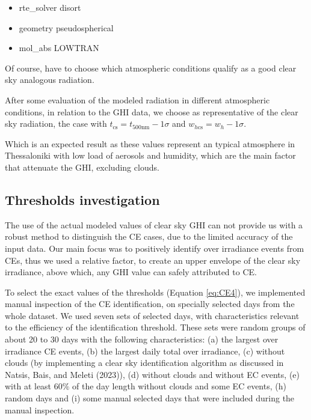 \documentclass[
]{article}
\providecommand{\tightlist}{%
  \setlength{\itemsep}{0pt}\setlength{\parskip}{0pt}}
\begin{document}
\begin{itemize}
\tightlist
\item
  rte\_solver disort
\item
  geometry pseudospherical
\item
  mol\_abs LOWTRAN
\end{itemize}

Of course, have to choose which atmospheric conditions qualify as a good clear sky analogous radiation.

After some evaluation of the modeled radiation in different atmospheric conditions,
in relation to the GHI data, we choose as representative of the clear sky radiation,
the case with
\(t_{\text{cs}} = t_{500\text{nm}} - 1\sigma\) and \(w_{h\text{cs}} = w_h - 1\sigma\).

Which is an expected result as these values represent an typical atmosphere in
Thessaloniki with low load of aerosols and humidity, which are the main factor that
attenuate the GHI, excluding clouds.

\hypertarget{thresholds-investigation}{%
\subsection{Thresholds investigation}\label{thresholds-investigation}}

The use of the actual modeled values of clear sky GHI can not provide us with a
robust method to distinguish the CE cases, due to the limited accuracy of the input
data. Our main focus was to positively identify over irradiance events from CEs,
thus we used a relative factor, to create an upper envelope of the clear sky
irradiance, above which, any GHI value can safely attributed to CE.

To select the exact values of the thresholds (Equation \ref{eq:CE4}), we implemented
manual inspection of the CE identification, on specially selected days from the whole
dataset. We used seven sets of selected days, with characteristics relevant to the
efficiency of the identification threshold. These sets were random groups of about
20 to 30 days with the following characteristics:
(a) the largest over irradiance CE events,
(b) the largest daily total over irradiance,
(c) without clouds (by implementing a clear sky identification algorithm as discussed in Natsis, Bais, and Meleti (2023)),
(d) without clouds and without EC events,
(e) with at least \(60\%\) of the day length without clouds and some EC events,
(h) random days and
(i) some manual selected days that were included during the manual inspection.
\end{document}
